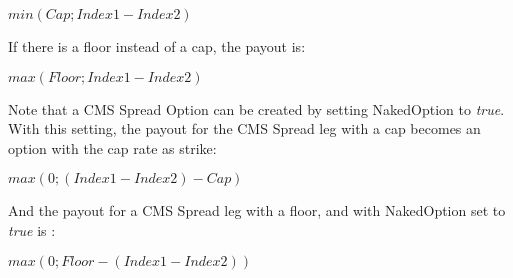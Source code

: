 $
min (Cap; Index1 - Index2) 
$

If there is a floor instead of a cap, the payout is:

$
max (Floor; Index1 - Index2) 
$

Note that a CMS Spread Option can be created by setting NakedOption to \emph{true}. With this setting, the payout for the CMS Spread leg with a cap becomes an option with the cap rate as strike:

$
max (0; (Index1 - Index2) - Cap) 
$

And the payout for a CMS Spread leg with a floor, and with NakedOption set to \emph{true} is :

$
max (0; Floor - (Index1 - Index2))
$
